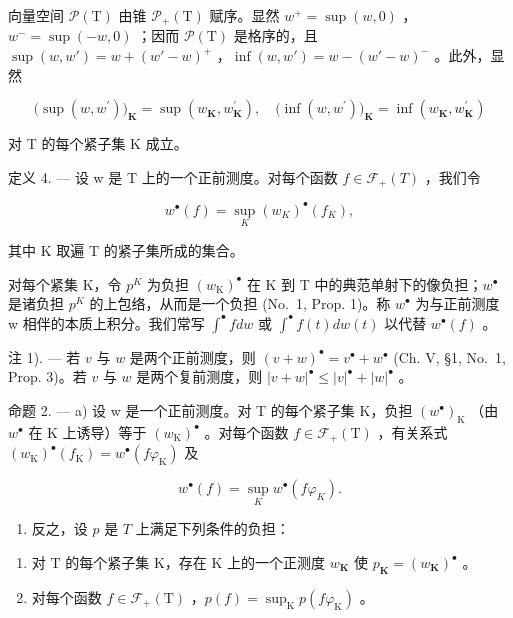 向量空间 \(\mathcal{P}(\mathrm{T})\) 由锥 \(\mathcal{P}_{+}(\mathrm{T})\) 赋序。显然 \(w^{+} = \sup(w,0)\) ，\(w^{-} = \sup(-w,0)\) ；因而 \(\mathcal{P}(\mathrm{T})\) 是格序的，且 \(\sup(w,w') = w + (w' - w)^{+}\) ，\(\inf(w,w') = w - (w' - w)^{-}\) 。此外，显然

\[
\big (\sup (w, w ^ {\prime}) \big) _ {\mathbf {K}} = \sup (w _ {\mathbf {K}}, w _ {\mathbf {K}} ^ {\prime}), \quad \big (\inf (w, w ^ {\prime}) \big) _ {\mathbf {K}} = \inf (w _ {\mathbf {K}}, w _ {\mathbf {K}} ^ {\prime})
\]

对 T 的每个紧子集 K 成立。

定义 4. --- 设 w 是 T 上的一个正前测度。对每个函数 \(f \in \mathcal{F}_{+}(T)\) ，我们令

\[
w ^ {\bullet} (f) = \sup _ {K} \left(w _ {K}\right) ^ {\bullet} \left(f _ {K}\right),\tag{1}
\]

其中 K 取遍 T 的紧子集所成的集合。

对每个紧集 K，令 \(p^{K}\) 为负担 \((w_{\mathrm{K}})^{\bullet}\) 在 K 到 T 中的典范单射下的像负担；\(w^{\bullet}\) 是诸负担 \(p^{K}\) 的上包络，从而是一个负担 (No.~1, Prop. 1)。称 \(w^{\bullet}\) 为与正前测度 w 相伴的本质上积分。我们常写 \(\int^{\bullet} f dw\) 或 \(\int^{\bullet} f(t) dw(t)\) 以代替 \(w^{\bullet}(f)\) 。

注 1). --- 若 \(v\) 与 \(w\) 是两个正前测度，则 \((v + w)^{\bullet} = v^{\bullet} + w^{\bullet}\) (Ch. V, §1, No.~1, Prop. 3)。若 \(v\) 与 \(w\) 是两个复前测度，则 \(|v + w|^{\bullet} \leqslant |v|^{\bullet} + |w|^{\bullet}\) 。

命题 2. --- a) 设 w 是一个正前测度。对 T 的每个紧子集 K，负担 \((w^{\bullet})_{\mathrm{K}}\) （由 \(w^{\bullet}\) 在 K 上诱导）等于 \((w_{\mathrm{K}})^{\bullet}\) 。对每个函数 \(f \in \mathcal{F}_{+}(\mathrm{T})\) ，有关系式 \((w_{\mathrm{K}})^{\bullet}(f_{\mathrm{K}}) = w^{\bullet}(f\varphi_{\mathrm{K}})\) 及

\[
w ^ {\bullet} (f) = \sup _ {K} w ^ {\bullet} (f \varphi_ {K}).\tag{2}
\]

\begin{enumerate}
\def\labelenumi{\alph{enumi})}
\setcounter{enumi}{1}
\tightlist
\item
  反之，设 \(p\) 是 \(T\) 上满足下列条件的负担：
\end{enumerate}

\begin{enumerate}
\def\labelenumi{\arabic{enumi})}
\item
  对 T 的每个紧子集 K，存在 K 上的一个正测度 \(w_{\mathbf{K}}\) 使 \(p_{\mathbf{K}} = (w_{\mathbf{K}})^{\bullet}\) 。
\item
  对每个函数 \(f \in \mathcal{F}_{+}(\mathrm{T})\) ，\(p(f) = \sup_{\mathrm{K}} p(f\varphi_{\mathrm{K}})\) 。
\end{enumerate}

